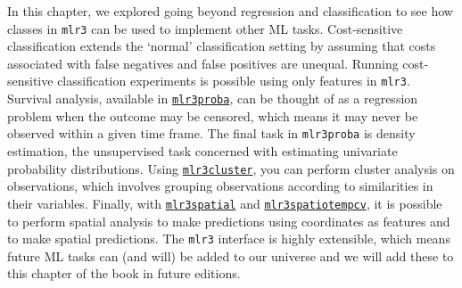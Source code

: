 In this chapter, we explored going beyond regression and classification
to see how classes in \texttt{mlr3} can be used to implement other ML
tasks. Cost-sensitive classification extends the `normal' classification
setting by assuming that costs associated with false
negatives and false
positives are unequal. Running cost-sensitive
classification experiments is possible using only features in
\texttt{mlr3}. Survival analysis, available in
\href{https://mlr3proba.mlr-org.com}{\texttt{mlr3proba}},
can be thought of as a regression problem when the outcome may be
censored, which means it may never be observed within a given time
frame. The final task in \texttt{mlr3proba} is density estimation, the
unsupervised task concerned with estimating univariate probability
distributions. Using
\href{https://mlr3cluster.mlr-org.com}{\texttt{mlr3cluster}},
you can perform cluster analysis on observations, which involves
grouping observations according to similarities in their variables.
Finally, with
\href{https://mlr3spatial.mlr-org.com}{\texttt{mlr3spatial}}
and
\href{https://mlr3spatiotempcv.mlr-org.com}{\texttt{mlr3spatiotempcv}},
it is possible to perform spatial analysis to make predictions using
coordinates as features and to make spatial predictions. The
\texttt{mlr3} interface is highly extensible, which means future ML
tasks can (and will) be added to our universe and we will add these to
this chapter of the book in future editions.

